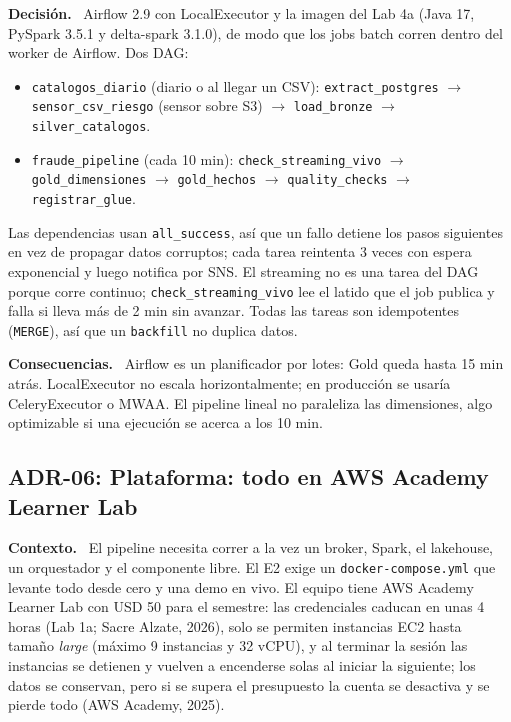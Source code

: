 \documentclass[12pt,letterpaper]{article}
\newcommand{\code}[1]{{\small\texttt{#1}}}
\newcommand{\adrpart}[1]{\textbf{#1.}~}
\begin{document}
\adrpart{Decisión} Airflow 2.9 con LocalExecutor y la imagen del Lab 4a (Java 17, PySpark 3.5.1 y delta-spark 3.1.0), de modo que los jobs batch corren dentro del worker de Airflow. Dos DAG:
\begin{itemize}\sloppy
  \item \code{catalogos\_diario} (diario o al llegar un CSV): \code{extract\_postgres} $\rightarrow$ \code{sensor\_csv\_riesgo} (sensor sobre S3) $\rightarrow$ \code{load\_bronze} $\rightarrow$ \code{silver\_catalogos}.
  \item \code{fraude\_pipeline} (cada 10 min): \code{check\_streaming\_vivo} $\rightarrow$ \code{gold\_dimensiones} $\rightarrow$ \code{gold\_hechos} $\rightarrow$ \code{quality\_checks} $\rightarrow$ \code{registrar\_glue}.
\end{itemize}
\noindent Las dependencias usan \code{all\_success}, así que un fallo detiene los pasos siguientes en vez de propagar datos corruptos; cada tarea reintenta 3 veces con espera exponencial y luego notifica por SNS. El streaming no es una tarea del DAG porque corre continuo; \code{check\_streaming\_vivo} lee el latido que el job publica y falla si lleva más de 2 min sin avanzar. Todas las tareas son idempotentes (\code{MERGE}), así que un \code{backfill} no duplica datos.

\adrpart{Consecuencias} Airflow es un planificador por lotes: Gold queda hasta 15 min atrás. LocalExecutor no escala horizontalmente; en producción se usaría CeleryExecutor o MWAA. El pipeline lineal no paraleliza las dimensiones, algo optimizable si una ejecución se acerca a los 10 min.

\subsection*{ADR-06: Plataforma: todo en AWS Academy Learner Lab}

\adrpart{Contexto} El pipeline necesita correr a la vez un broker, Spark, el lakehouse, un orquestador y el componente libre. El E2 exige un \code{docker-compose.yml} que levante todo desde cero y una demo en vivo. El equipo tiene AWS Academy Learner Lab con USD 50 para el semestre: las credenciales caducan en unas 4 horas (Lab 1a; Sacre Alzate, 2026), solo se permiten instancias EC2 hasta tamaño \emph{large} (máximo 9 instancias y 32 vCPU), y al terminar la sesión las instancias se detienen y vuelven a encenderse solas al iniciar la siguiente; los datos se conservan, pero si se supera el presupuesto la cuenta se desactiva y se pierde todo (AWS Academy, 2025).
\end{document}
